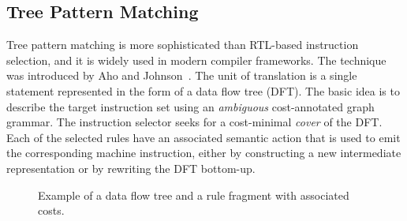 \subsection{Tree Pattern Matching}
\label{sec:tpm}
Tree pattern matching is more sophisticated than RTL-based instruction
selection, and it is widely used in modern compiler frameworks. The
technique was introduced by Aho and Johnson~\cite{aj:76}. The unit of
translation is a single statement represented in the form of a data
flow tree (DFT). The basic idea is to describe the target instruction
set using an \emph{ambiguous} cost-annotated graph grammar. The
instruction selector seeks for a cost-minimal \emph{cover} of the
DFT. Each of the selected rules have an associated semantic action
that is used to emit the corresponding machine instruction, either by
constructing a new intermediate representation or by rewriting the DFT
bottom-up.
\begin{figure}[ht]
  \begin{center}
  \end{center}
  \caption{Example of a data flow tree and a rule fragment with
    associated costs.}\label{fig:tpm}
\end{figure}


